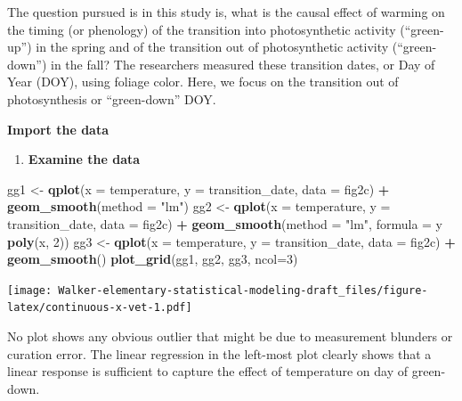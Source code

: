 \documentclass[]{book}
\newenvironment{Shaded}{\begin{snugshade}}{\end{snugshade}}
\newcommand{\DataTypeTok}[1]{\textcolor[rgb]{0.13,0.29,0.53}{#1}}
\newcommand{\DecValTok}[1]{\textcolor[rgb]{0.00,0.00,0.81}{#1}}
\newcommand{\KeywordTok}[1]{\textcolor[rgb]{0.13,0.29,0.53}{\textbf{#1}}}
\newcommand{\NormalTok}[1]{#1}
\newcommand{\OperatorTok}[1]{\textcolor[rgb]{0.81,0.36,0.00}{\textbf{#1}}}
\newcommand{\StringTok}[1]{\textcolor[rgb]{0.31,0.60,0.02}{#1}}
\providecommand{\tightlist}{%
  \setlength{\itemsep}{0pt}\setlength{\parskip}{0pt}}
\begin{document}
The question pursued is in this study is, what is the causal effect of warming on the timing (or phenology) of the transition into photosynthetic activity (``green-up'') in the spring and of the transition out of photosynthetic activity (``green-down'') in the fall? The researchers measured these transition dates, or Day of Year (DOY), using foliage color. Here, we focus on the transition out of photosynthesis or ``green-down'' DOY.

\textbf{Import the data}

\begin{enumerate}
\def\labelenumi{\arabic{enumi}.}
\tightlist
\item
  \textbf{Examine the data}
\end{enumerate}

\begin{Shaded}
\begin{Highlighting}[]
\NormalTok{gg1 <-}\StringTok{ }\KeywordTok{qplot}\NormalTok{(}\DataTypeTok{x =}\NormalTok{ temperature,}
      \DataTypeTok{y =}\NormalTok{ transition_date,}
      \DataTypeTok{data =}\NormalTok{ fig2c) }\OperatorTok{+}
\StringTok{  }\KeywordTok{geom_smooth}\NormalTok{(}\DataTypeTok{method =} \StringTok{"lm"}\NormalTok{)}
\NormalTok{gg2 <-}\StringTok{ }\KeywordTok{qplot}\NormalTok{(}\DataTypeTok{x =}\NormalTok{ temperature,}
      \DataTypeTok{y =}\NormalTok{ transition_date,}
      \DataTypeTok{data =}\NormalTok{ fig2c) }\OperatorTok{+}
\StringTok{  }\KeywordTok{geom_smooth}\NormalTok{(}\DataTypeTok{method =} \StringTok{"lm"}\NormalTok{, }\DataTypeTok{formula =}\NormalTok{ y }\OperatorTok{~}\StringTok{ }\KeywordTok{poly}\NormalTok{(x, }\DecValTok{2}\NormalTok{))}
\NormalTok{gg3 <-}\StringTok{ }\KeywordTok{qplot}\NormalTok{(}\DataTypeTok{x =}\NormalTok{ temperature,}
      \DataTypeTok{y =}\NormalTok{ transition_date,}
      \DataTypeTok{data =}\NormalTok{ fig2c) }\OperatorTok{+}
\StringTok{  }\KeywordTok{geom_smooth}\NormalTok{()}
\KeywordTok{plot_grid}\NormalTok{(gg1, gg2, gg3, }\DataTypeTok{ncol=}\DecValTok{3}\NormalTok{)}
\end{Highlighting}
\end{Shaded}

\texttt{[image: Walker-elementary-statistical-modeling-draft\_files/figure-latex/continuous-x-vet-1.pdf]}

No plot shows any obvious outlier that might be due to measurement blunders or curation error. The linear regression in the left-most plot clearly shows that a linear response is sufficient to capture the effect of temperature on day of green-down.
\end{document}
